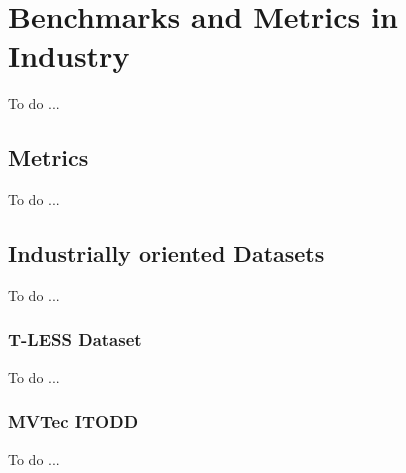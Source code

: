 \chapter{Benchmarks and Metrics in Industry}\label{ch:benchmarks_and_metrics}
To do ...

\section{Metrics}\label{sec:metrics}
To do ...

\section{Industrially oriented Datasets}\label{sec:datasets}
To do ...

\subsection{T-LESS Dataset}\label{subsec:tless_dataset}
To do ...

\subsection{MVTec ITODD}\label{subsec:mvtex_itodd}
To do ...